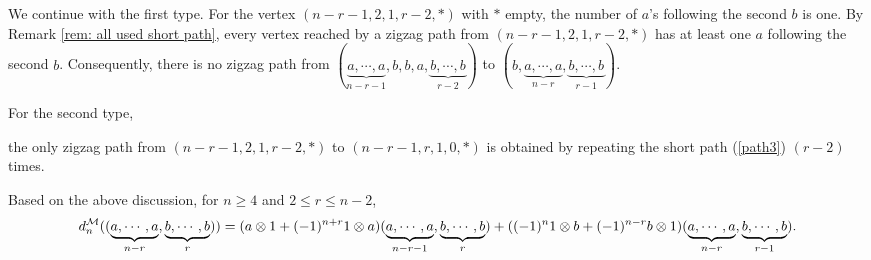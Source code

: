 \documentclass[10pt, reqno]{amsart}
\theoremstyle{definition}
\theoremstyle{remark}
\numberwithin{equation}{section}
\begin{document}
We continue with the first type. For the vertex \((n-r-1, 2, 1, r-2, *)\) with \(*\) empty, the number of \(a\)'s following the second \(b\) is one. By Remark \ref{rem: all used short path}, every vertex reached by a zigzag path from \((n-r-1, 2, 1, r-2, *)\) has at least one \(a\) following the second \(b\). Consequently, there is no zigzag path from  \((\underbrace{a, \cdots,a}_{n-r-1}, b, b, a, \underbrace{b, \cdots,b}_{r-2})\) to \((b, \underbrace{a, \cdots,a}_{n-r}, \underbrace{b, \cdots,b}_{r-1})\).

For the second type, 

the only zigzag path from \((n-r-1, 2, 1, r-2, *)\) to \((n-r-1, r, 1, 0, *)\) is obtained by repeating the short path (\ref{path3}) \((r-2)\) times.

Based on the above discussion, for \(n\ge 4\) and $2\le r \le n-2$,
\[d_n^{\mathcal{M}}((\underbrace{a, \cdots,a}_{n-r},\underbrace{b, \cdots,b}_r))= (a \otimes 1 + (-1)^{n+r}1\otimes a) (\underbrace{a, \cdots,a}_{n-r-1},\underbrace{b, \cdots,b}_r)+((-1)^n 1\otimes b+(-1)^{n-r}b \otimes 1)(\underbrace{a, \cdots,a}_{n-r},\underbrace{b, \cdots,b}_{r-1}).\]



\end{document}
